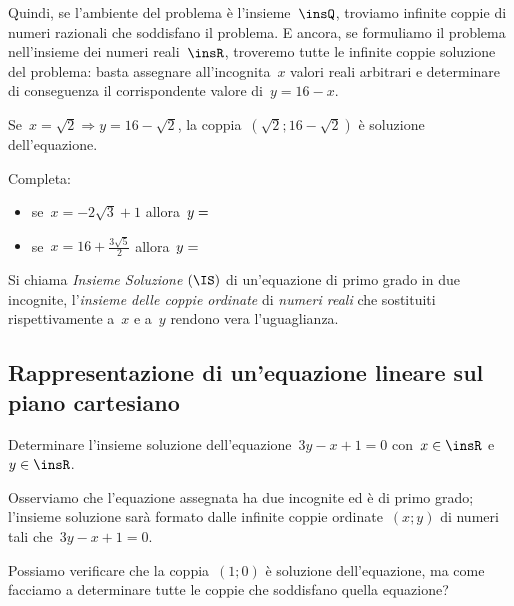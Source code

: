 \begin{soluzione}
Quindi, se l'ambiente del problema è
l'insieme~\(\insQ\), troviamo infinite coppie di
numeri razionali che soddisfano il problema.
E ancora, se formuliamo il problema nell'insieme dei
numeri reali~\(\insR\), troveremo tutte le infinite coppie
soluzione del problema: basta assegnare all'incognita~\(x\)
valori reali arbitrari e determinare di conseguenza il corrispondente
valore di~\(y=16-x\).

Se~\(x=\sqrt{2}\Rightarrow y=16-\sqrt{2}\), la 
coppia~\(\left(\sqrt{2};16-\sqrt{2}\right)\) è soluzione
dell'equazione. 


Completa:

\begin{itemize}
\item se~\(x=-2\sqrt{3}+1\) allora~\(y=\dotfill\)
\item se~\(x=16+\frac{3\sqrt{5}}{2}\) allora~\(y=\dotfill\)
\end{itemize}
\end{soluzione}

\begin{definizione}
Si chiama \emph{Insieme Soluzione} \((\IS)\) di un'equazione di primo
grado in due incognite, l'\emph{insieme delle coppie
ordinate} di \emph{numeri reali} che sostituiti rispettivamente a~\(x\) e
a~\(y\) rendono vera l'uguaglianza.
\end{definizione}


\subsection{Rappresentazione di un'equazione lineare sul piano cartesiano}

 \begin{esempio}
Determinare l'insieme soluzione dell'equazione~\(3y-x+1=0\) con~\(x\in\insR\) 
e~\(y\in\insR\).
 \end{esempio}
Osserviamo che l'equazione assegnata ha due incognite ed
è di primo grado; l'insieme soluzione sarà formato
dalle infinite coppie ordinate~\((x;y)\) di numeri tali che~\(3y-x+1=0\).

Possiamo verificare che la coppia~\((1;0)\) è soluzione
dell'equazione, ma come facciamo a determinare tutte le
coppie che soddisfano quella equazione?

